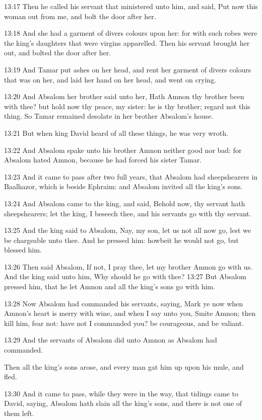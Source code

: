 13:17 Then he called his servant that ministered unto him, and said,
Put now this woman out from me, and bolt the door after her.

13:18 And she had a garment of divers colours upon her: for with such
robes were the king's daughters that were virgins apparelled. Then his
servant brought her out, and bolted the door after her.

13:19 And Tamar put ashes on her head, and rent her garment of divers
colours that was on her, and laid her hand on her head, and went on
crying.

13:20 And Absalom her brother said unto her, Hath Amnon thy brother
been with thee? but hold now thy peace, my sister: he is thy brother;
regard not this thing. So Tamar remained desolate in her brother
Absalom's house.

13:21 But when king David heard of all these things, he was very
wroth.

13:22 And Absalom spake unto his brother Amnon neither good nor bad:
for Absalom hated Amnon, because he had forced his sister Tamar.

13:23 And it came to pass after two full years, that Absalom had
sheepshearers in Baalhazor, which is beside Ephraim: and Absalom
invited all the king's sons.

13:24 And Absalom came to the king, and said, Behold now, thy servant
hath sheepshearers; let the king, I beseech thee, and his servants go
with thy servant.

13:25 And the king said to Absalom, Nay, my son, let us not all now
go, lest we be chargeable unto thee. And he pressed him: howbeit he
would not go, but blessed him.

13:26 Then said Absalom, If not, I pray thee, let my brother Amnon go
with us. And the king said unto him, Why should he go with thee?
13:27 But Absalom pressed him, that he let Amnon and all the king's
sons go with him.

13:28 Now Absalom had commanded his servants, saying, Mark ye now when
Amnon's heart is merry with wine, and when I say unto you, Smite
Amnon; then kill him, fear not: have not I commanded you? be
courageous, and be valiant.

13:29 And the servants of Absalom did unto Amnon as Absalom had
commanded.

Then all the king's sons arose, and every man gat him up upon his
mule, and fled.

13:30 And it came to pass, while they were in the way, that tidings
came to David, saying, Absalom hath slain all the king's sons, and
there is not one of them left.

